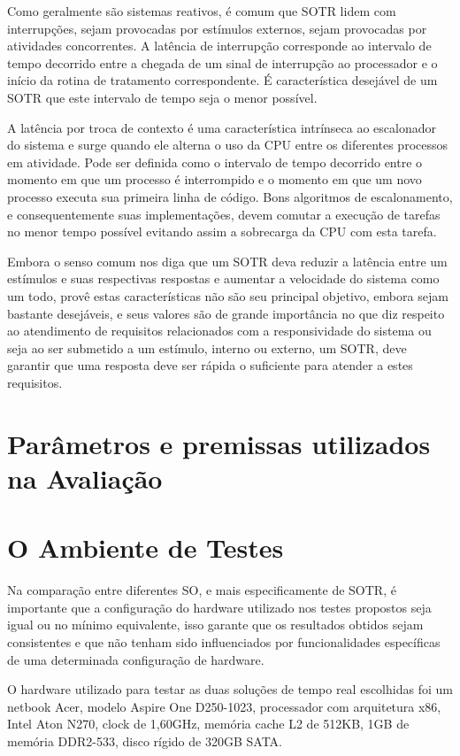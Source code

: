 Como geralmente são sistemas reativos, é comum que SOTR lidem com interrupções, sejam provocadas por estímulos externos, sejam provocadas por atividades concorrentes. A latência de interrupção corresponde ao intervalo de tempo decorrido entre a chegada de um sinal de interrupção ao processador e o início da rotina de tratamento correspondente. É característica desejável de um SOTR que este intervalo de tempo seja o menor possível.

A latência por troca de contexto é uma característica intrínseca ao escalonador do sistema e surge quando ele alterna o uso da CPU entre os diferentes processos em atividade. Pode ser definida como o intervalo de tempo decorrido entre o momento em que um processo é interrompido e o momento em que um novo processo executa sua primeira linha de código. Bons algoritmos de escalonamento, e consequentemente suas implementações, devem comutar a execução de tarefas no menor tempo possível evitando assim a sobrecarga da CPU com esta tarefa.

Embora o senso comum nos diga que um SOTR deva reduzir a latência entre um estímulos e suas respectivas respostas e aumentar a velocidade do sistema como um todo, provê estas características não são seu principal objetivo, embora sejam bastante desejáveis, e seus valores são de grande importância no que diz respeito ao atendimento de requisitos relacionados com a responsividade do sistema ou seja ao ser submetido a um estímulo, interno ou externo, um SOTR, deve garantir que uma resposta deve ser rápida o suficiente para atender a estes requisitos.

\section{Parâmetros e premissas utilizados na Avaliação}

\section{O Ambiente de Testes}
Na comparação entre diferentes SO, e mais especificamente de SOTR,  é importante que a configuração do hardware utilizado nos testes propostos seja igual ou no mínimo equivalente, isso garante que os resultados obtidos sejam consistentes e que não tenham sido influenciados por funcionalidades específicas de uma determinada configuração de hardware.

O hardware utilizado para testar as duas soluções de tempo real escolhidas foi um netbook Acer, modelo Aspire One D250-1023, processador com arquitetura x86, Intel Aton N270, clock de 1,60GHz, memória cache L2 de 512KB, 1GB de memória DDR2-533, disco rígido de 320GB SATA.

